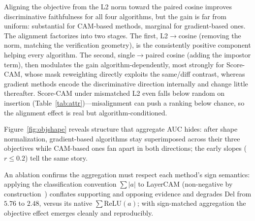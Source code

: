 \documentclass{article}
\begin{document}
Aligning the objective from the L2 norm toward the paired cosine improves discriminative faithfulness for all four algorithms, but the gain is far from uniform: substantial for CAM-based methods, marginal for gradient-based ones. The alignment factorizes into two stages. The first, L2$\to$cosine (removing the norm, matching the verification geometry), is the consistently positive component helping every algorithm. The second, single$\to$paired cosine (adding the impostor term), then modulates the gain algorithm-dependently, most strongly for Score-CAM, whose mask reweighting directly exploits the same/diff contrast, whereas gradient methods encode the discriminative direction internally and change little thereafter. Score-CAM under mismatched L2 even falls below random on insertion (Table~\ref{tab:attr})---misalignment can push a ranking below chance, so the alignment effect is real but algorithm-conditioned.



Figure~\ref{fig:objshape} reveals structure that aggregate AUC hides: after shape normalization, gradient-based algorithms stay superimposed across their three objectives while CAM-based ones fan apart in both directions; the early slopes ($r\leq0.2$) tell the same story.

An ablation confirms the aggregation must respect each method's sign semantics: applying the classification convention $\sum|a|$ to LayerCAM (non-negative by construction~\cite{jiang2021layercam}) conflates supporting and opposing evidence and degrades Del from $5.76$ to $2.48$, versus its native $\sum\text{ReLU}(a)$; with sign-matched aggregation the objective effect emerges cleanly and reproducibly.
\end{document}
